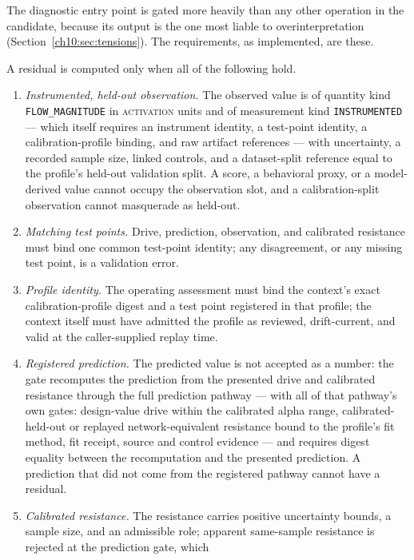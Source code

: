 The diagnostic entry point is gated more heavily than any other
operation in the candidate, because its output is the one most liable to
overinterpretation (Section~\ref{ch10:sec:tensions}). The requirements,
as implemented, are these.

\begin{ruleenv}\label{ch10:rule:admission}
A residual is computed only when all of the following hold.
\begin{enumerate}
\item \emph{Instrumented, held-out observation.} The observed value is of
quantity kind \texttt{FLOW\_MAGNITUDE} in \textsc{activation} units and
of measurement kind \texttt{INSTRUMENTED} --- which itself requires an
instrument identity, a test-point identity, a calibration-profile
binding, and raw artifact references --- with uncertainty, a recorded
sample size, linked controls, and a dataset-split reference equal to the
profile's held-out validation split. A score, a behavioral proxy, or a
model-derived value cannot occupy the observation slot, and a
calibration-split observation cannot masquerade as held-out.
\item \emph{Matching test points.} Drive, prediction, observation, and
calibrated resistance must bind one common test-point identity; any
disagreement, or any missing test point, is a validation error.
\item \emph{Profile identity.} The operating assessment must bind the
context's exact calibration-profile digest and a test point registered
in that profile; the context itself must have admitted the profile as
reviewed, drift-current, and valid at the caller-supplied replay time.
\item \emph{Registered prediction.} The predicted value is not accepted
as a number: the gate recomputes the prediction from the presented drive
and calibrated resistance through the full prediction pathway --- with
all of that pathway's own gates: design-value drive within the
calibrated alpha range, calibrated-held-out or replayed
network-equivalent resistance bound to the profile's fit method, fit
receipt, source and control evidence --- and requires digest equality
between the recomputation and the presented prediction. A prediction
that did not come from the registered pathway cannot have a residual.
\item \emph{Calibrated resistance.} The resistance carries positive
uncertainty bounds, a sample size, and an admissible role; apparent
same-sample resistance is rejected at the prediction gate, which

\end{enumerate}
\end{ruleenv}
